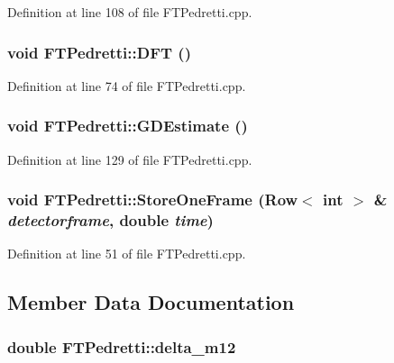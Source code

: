 Definition at line 108 of file FTPedretti.cpp.

\hypertarget{classFTPedretti_abbda83f3da7fc03afc92af8a9197b71e}{
\subsubsection[{DFT}]{\setlength{\rightskip}{0pt plus 5cm}void FTPedretti::DFT ()}}
\label{classFTPedretti_abbda83f3da7fc03afc92af8a9197b71e}


Definition at line 74 of file FTPedretti.cpp.

\hypertarget{classFTPedretti_aa5840df9985ff246fc42318c94c7779a}{
\subsubsection[{GDEstimate}]{\setlength{\rightskip}{0pt plus 5cm}void FTPedretti::GDEstimate ()}}
\label{classFTPedretti_aa5840df9985ff246fc42318c94c7779a}


Definition at line 129 of file FTPedretti.cpp.

\hypertarget{classFTPedretti_a8d57325be576602b6f3eb56c2b4ef19d}{
\subsubsection[{StoreOneFrame}]{\setlength{\rightskip}{0pt plus 5cm}void FTPedretti::StoreOneFrame ({\bf Row}$<$ int $>$ \& {\em detectorframe}, \/  double {\em time})}}
\label{classFTPedretti_a8d57325be576602b6f3eb56c2b4ef19d}


Definition at line 51 of file FTPedretti.cpp.



\subsection{Member Data Documentation}
\hypertarget{classFTPedretti_aa195ccba303a9bbf0e87de722e4e29c3}{
\subsubsection[{delta\_\-m12}]{\setlength{\rightskip}{0pt plus 5cm}double {\bf FTPedretti::delta\_\-m12}}}
\label{classFTPedretti_aa195ccba303a9bbf0e87de722e4e29c3}


